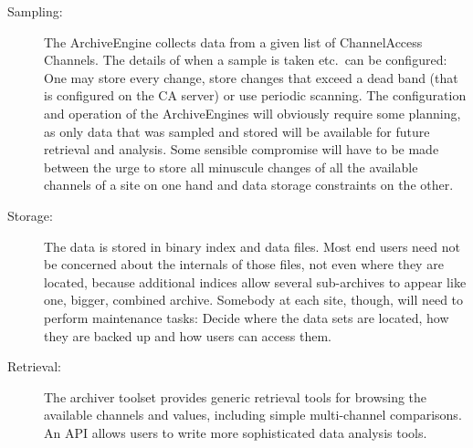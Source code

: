 \begin{description}
\item[\sffamily Sampling:]
The ArchiveEngine collects data from a given list of ChannelAccess
Channels.  The details of when a sample is taken etc.\ can be
configured: One may store every change, store changes that exceed a
dead band (that is configured on the CA server) or use periodic
scanning.
The configuration and operation of the ArchiveEngines will obviously
require some planning, as only data that was sampled and stored will
be available for future retrieval and analysis. Some sensible
compromise will have to be made between the urge to store all
minuscule changes of all the available channels of a site on one hand
and data storage constraints on the other.

\item[\sffamily Storage:]
The data is stored in binary index and data files. Most end users need not
be concerned about the internals of those files, not even where they
are located, because additional indices allow several sub-archives to
appear like one, bigger, combined archive.
Somebody at each site, though, will need to perform maintenance
tasks: Decide where the data sets are located, how they are
backed up and how users can access them. 

\item[\sffamily Retrieval:]
The archiver toolset provides generic retrieval tools for browsing the
available channels and values, including simple multi-channel
comparisons.
An API allows users to write more sophisticated data analysis tools.
\end{description}

